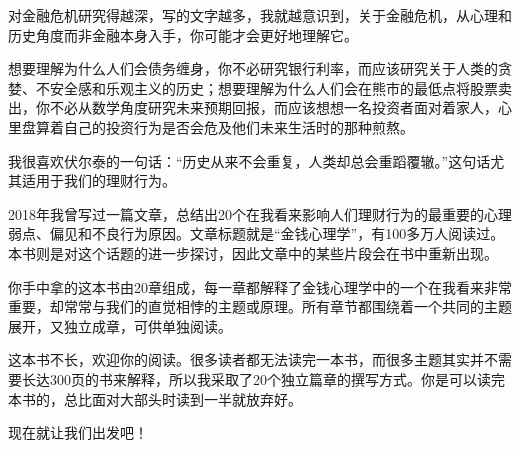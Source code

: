 对金融危机研究得越深，写的文字越多，我就越意识到，关于金融危机，从心理和历史角度而非金融本身入手，你可能才会更好地理解它。

想要理解为什么人们会债务缠身，你不必研究银行利率，而应该研究关于人类的贪婪、不安全感和乐观主义的历史；想要理解为什么人们会在熊市的最低点将股票卖出，你不必从数学角度研究未来预期回报，而应该想想一名投资者面对着家人，心里盘算着自己的投资行为是否会危及他们未来生活时的那种煎熬。

我很喜欢伏尔泰的一句话：“历史从来不会重复，人类却总会重蹈覆辙。”这句话尤其适用于我们的理财行为。

2018年我曾写过一篇文章，总结出20个在我看来影响人们理财行为的最重要的心理弱点、偏见和不良行为原因。文章标题就是“金钱心理学”，有100多万人阅读过。本书则是对这个话题的进一步探讨，因此文章中的某些片段会在书中重新出现。

你手中拿的这本书由20章组成，每一章都解释了金钱心理学中的一个在我看来非常重要，却常常与我们的直觉相悖的主题或原理。所有章节都围绕着一个共同的主题展开，又独立成章，可供单独阅读。

这本书不长，欢迎你的阅读。很多读者都无法读完一本书，而很多主题其实并不需要长达300页的书来解释，所以我采取了20个独立篇章的撰写方式。你是可以读完本书的，总比面对大部头时读到一半就放弃好。

现在就让我们出发吧！
